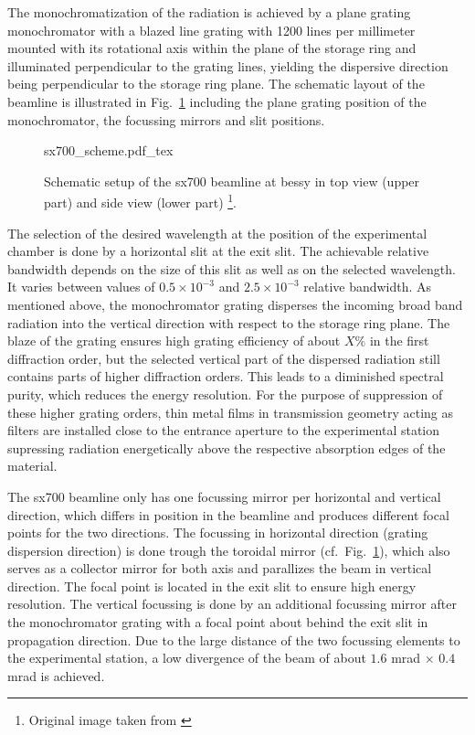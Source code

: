The monochromatization of the radiation is achieved by a plane grating monochromator with a blazed line grating with 1200 lines per millimeter mounted with its rotational axis within the plane of the storage ring and illuminated perpendicular to the grating lines, yielding the dispersive direction being perpendicular to the storage ring plane. The schematic layout of the beamline is illustrated in Fig.~\ref{ch_exp:fig_sx700_schematic} including the plane grating position of the monochromator, the focussing mirrors and slit positions.
\begin{figure}[htb]
    \def\svgwidth{\textwidth}
    {sx700_scheme.pdf_tex}
    \caption[Schematic setup of the SX700 beamline.]{Schematic setup of the \gls{sx700} beamline at \gls{bessy} in top view (upper part) and side view (lower part) \footnote{Original image taken from \textcite{scholze_high-accuracy_2001}}.}
    \label{ch_exp:fig_sx700_schematic}
\end{figure}
The selection of the desired wavelength at the position of the experimental chamber is done by a horizontal slit at the exit slit. The achievable relative bandwidth depends on the size of this slit as well as on the selected wavelength. It varies between values of $0.5\times 10^{-3}$ and $2.5\times 10^{-3}$ relative bandwidth. As mentioned above, the monochromator grating disperses the incoming broad band radiation into the vertical direction with respect to the storage ring plane. The blaze of the grating ensures high grating efficiency of about $X \%$ in the first diffraction order, but the selected vertical part of the dispersed radiation still contains parts of higher diffraction orders. This leads to a diminished spectral purity, which reduces the energy resolution. For the purpose of suppression of these higher grating orders, thin metal films in transmission geometry acting as filters are installed close to the entrance aperture to the experimental station supressing radiation energetically above the respective absorption edges of the material.

The \gls{sx700} beamline only has one focussing mirror per horizontal and vertical direction, which differs in position in the beamline and produces different focal points for the two directions. The focussing in horizontal direction (grating dispersion direction) is done trough the toroidal mirror (cf.~Fig.~\ref{ch_exp:fig_sx700_schematic}), which also serves as a collector mirror for both axis and parallizes the beam in vertical direction. The focal point is located in the exit slit to ensure high energy resolution. The vertical focussing is done by an additional focussing mirror after the monochromator grating with a focal point about  behind the exit slit in propagation direction. Due to the large distance of the two focussing elements to the experimental station, a low divergence of the beam of about $1.6$ mrad $\times$ $0.4$ mrad is achieved.


